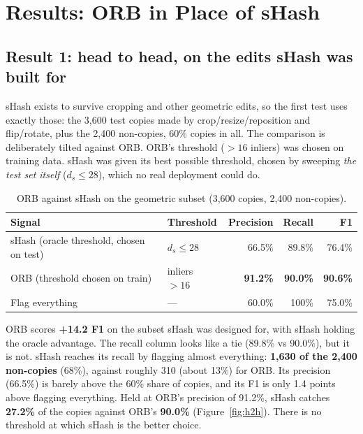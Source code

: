 \section{Results: ORB in Place of sHash}
\label{sec:results}

\subsection{Result 1: head to head, on the edits sHash was built for}

sHash exists to survive cropping and other geometric edits, so the first test uses exactly
those: the 3,600 test copies made by crop/resize/reposition and flip/rotate, plus the 2,400
non-copies, 60\% copies in all. The comparison is deliberately tilted against ORB. ORB's
threshold ($>16$ inliers) was chosen on training data. sHash was given its best possible
threshold, chosen by sweeping \emph{the test set itself} ($d_s\le 28$), which no real
deployment could do.

\begin{table}[ht]
\centering
\begin{tabular}{@{}llrrr@{}}
\toprule
Signal & Threshold & Precision & Recall & F1 \\
\midrule
sHash (oracle threshold, chosen on test) & $d_s \le 28$ & 66.5\% & 89.8\% & 76.4\% \\
ORB (threshold chosen on train)          & inliers $>16$ & \textbf{91.2\%} & \textbf{90.0\%} & \textbf{90.6\%} \\
\midrule
Flag everything                          & ---          & 60.0\% & 100\% & 75.0\% \\
\bottomrule
\end{tabular}
\caption{ORB against sHash on the geometric subset (3,600 copies, 2,400 non-copies).}
\label{tab:h2h}
\end{table}

ORB scores \textbf{+14.2 F1} on the subset sHash was designed for, with sHash holding the
oracle advantage. The recall column looks like a tie (89.8\% vs 90.0\%), but it is not. sHash
reaches its recall by flagging almost everything: \textbf{1,630 of the 2,400 non-copies}
(68\%), against roughly 310 (about 13\%) for ORB. Its precision (66.5\%) is barely above the
60\% share of copies, and its F1 is only 1.4 points above flagging everything. Held at
ORB's precision of 91.2\%, sHash catches \textbf{27.2\%} of the copies against ORB's
\textbf{90.0\%} (Figure~\ref{fig:h2h}). There is no threshold at which sHash is the better
choice.


